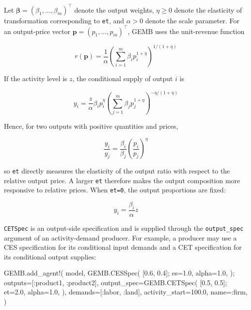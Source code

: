 \documentclass[
  letterpaper,
  DIV=11,
  numbers=noendperiod]{scrreprt}
\newenvironment{Shaded}{\begin{snugshade}}{\end{snugshade}}
\newcommand{\FloatTok}[1]{\textcolor[rgb]{0.68,0.00,0.00}{#1}}
\newcommand{\FunctionTok}[1]{\textcolor[rgb]{0.28,0.35,0.67}{#1}}
\newcommand{\NormalTok}[1]{\textcolor[rgb]{0.00,0.23,0.31}{#1}}
\newcommand{\OperatorTok}[1]{\textcolor[rgb]{0.37,0.37,0.37}{#1}}
\begin{document}
Let \(\boldsymbol{\beta}=(\beta_1,\ldots,\beta_m)^\top\) denote the
output weights, \(\eta\geq0\) denote the elasticity of transformation
corresponding to \texttt{et}, and \(\alpha>0\) denote the scale
parameter. For an output-price vector
\(\mathbf p=(p_1,\ldots,p_m)^\top\), GEMB uses the unit-revenue function

\[
r(\mathbf p)
=
\frac{1}{\alpha}
\left(
\sum_{i=1}^m
\beta_i p_i^{1+\eta}
\right)^{1/(1+\eta)}
\]

If the activity level is \(z\), the conditional supply of output \(i\)
is

\[
y_i
=
\frac{z}{\alpha}
\beta_i p_i^\eta
\left(
\sum_{j=1}^m
\beta_jp_j^{1+\eta}
\right)^{-\eta/(1+\eta)}
\]

Hence, for two outputs with positive quantities and prices,

\[
\frac{y_i}{y_j}
=
\frac{\beta_i}{\beta_j}
\left(
\frac{p_i}{p_j}
\right)^\eta
\]

so \texttt{et} directly measures the elasticity of the output ratio with
respect to the relative output price. A larger \texttt{et} therefore
makes the output composition more responsive to relative prices. When
\texttt{et=0}, the output proportions are fixed:

\[
y_i
=
\frac{\beta_i}{\alpha}z
\]

\texttt{CETSpec} is an output-side specification and is supplied through
the \texttt{output\_spec} argument of an activity-demand producer. For
example, a producer may use a CES specification for its conditional
input demands and a CET specification for its conditional output
supplies:

\begin{Shaded}
\begin{Highlighting}[]
\NormalTok{GEMB.}\FunctionTok{add\_agent!}\NormalTok{(}
\NormalTok{    model,}
\NormalTok{    GEMB.}\FunctionTok{CESSpec}\NormalTok{(}
\NormalTok{        [}\FloatTok{0.6}\NormalTok{, }\FloatTok{0.4}\NormalTok{];}
\NormalTok{        es}\OperatorTok{=}\FloatTok{1.0}\NormalTok{,}
\NormalTok{        alpha}\OperatorTok{=}\FloatTok{1.0}\NormalTok{,}
\NormalTok{    );}
\NormalTok{    outputs}\OperatorTok{=}\NormalTok{[}\OperatorTok{:}\NormalTok{product1, }\OperatorTok{:}\NormalTok{product2],}
\NormalTok{    output\_spec}\OperatorTok{=}\NormalTok{GEMB.}\FunctionTok{CETSpec}\NormalTok{(}
\NormalTok{        [}\FloatTok{0.5}\NormalTok{, }\FloatTok{0.5}\NormalTok{];}
\NormalTok{        et}\OperatorTok{=}\FloatTok{2.0}\NormalTok{,}
\NormalTok{        alpha}\OperatorTok{=}\FloatTok{1.0}\NormalTok{,}
\NormalTok{    ),}
\NormalTok{    demands}\OperatorTok{=}\NormalTok{[}\OperatorTok{:}\NormalTok{labor, }\OperatorTok{:}\NormalTok{land],}
\NormalTok{    activity\_start}\OperatorTok{=}\FloatTok{100.0}\NormalTok{,}
\NormalTok{    name}\OperatorTok{=:}\NormalTok{firm,}
\NormalTok{)}
\end{Highlighting}
\end{Shaded}
\end{document}
